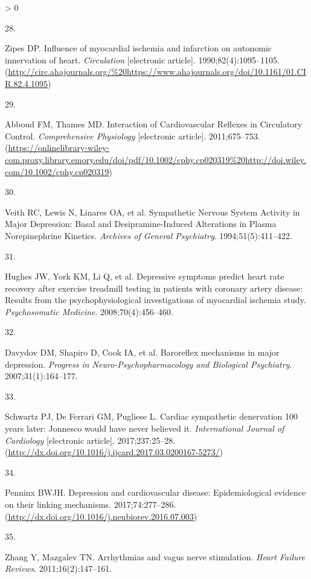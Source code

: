 \documentclass[
  11pt,
  openany]{book}
\newlength{\cslhangindent}
\newlength{\csllabelwidth}
\newenvironment{CSLReferences}[2] %
 {%
  \setlength{\parindent}{0pt}
  \ifodd #1 \everypar{\setlength{\hangindent}{\cslhangindent}}\ignorespaces\fi
  \ifnum #2 > 0
  \setlength{\parskip}{#2\baselineskip}
  \fi
 }%
 {}
\newcommand{\CSLLeftMargin}[1]{\parbox[t]{\csllabelwidth}{#1}}
\newcommand{\CSLRightInline}[1]{\parbox[t]{\linewidth - \csllabelwidth}{#1}\break}
\begin{document}
\begin{CSLReferences}{0}{0}
\leavevmode\hypertarget{ref-Zipes1990}{}%
\CSLLeftMargin{28. }
\CSLRightInline{Zipes DP. {Influence of myocardial ischemia and infarction on autonomic innervation of heart.} \emph{Circulation} {[}electronic article{]}. 1990;82(4):1095--1105. (\url{http://circ.ahajournals.org/\%20https://www.ahajournals.org/doi/10.1161/01.CIR.82.4.1095})}

\leavevmode\hypertarget{ref-Abboud2011}{}%
\CSLLeftMargin{29. }
\CSLRightInline{Abboud FM, Thames MD. {Interaction of Cardiovascular Reflexes in Circulatory Control}. \emph{Comprehensive Physiology} {[}electronic article{]}. 2011;675--753. (\url{https://onlinelibrary-wiley-com.proxy.library.emory.edu/doi/pdf/10.1002/cphy.cp020319\%20http://doi.wiley.com/10.1002/cphy.cp020319})}

\leavevmode\hypertarget{ref-Veith1994b}{}%
\CSLLeftMargin{30. }
\CSLRightInline{Veith RC, Lewis N, Linares OA, et al. {Sympathetic Nervous System Activity in Major Depression: Basal and Desipramine-Induced Alterations in Plasma Norepinephrine Kinetics}. \emph{Archives of General Psychiatry}. 1994;51(5):411--422. }

\leavevmode\hypertarget{ref-Hughes2008}{}%
\CSLLeftMargin{31. }
\CSLRightInline{Hughes JW, York KM, Li Q, et al. {Depressive symptoms predict heart rate recovery after exercise treadmill testing in patients with coronary artery disease: Results from the psychophysiological investigations of myocardial ischemia study}. \emph{Psychosomatic Medicine}. 2008;70(4):456--460. }

\leavevmode\hypertarget{ref-Davydov2007}{}%
\CSLLeftMargin{32. }
\CSLRightInline{Davydov DM, Shapiro D, Cook IA, et al. {Baroreflex mechanisms in major depression}. \emph{Progress in Neuro-Psychopharmacology and Biological Psychiatry}. 2007;31(1):164--177. }

\leavevmode\hypertarget{ref-Schwartz2017a}{}%
\CSLLeftMargin{33. }
\CSLRightInline{Schwartz PJ, De Ferrari GM, Pugliese L. {Cardiac sympathetic denervation 100 years later: Jonnesco would have never believed it}. \emph{International Journal of Cardiology} {[}electronic article{]}. 2017;237:25--28. (\url{http://dx.doi.org/10.1016/j.ijcard.2017.03.0200167-5273/})}

\leavevmode\hypertarget{ref-Penninx2017}{}%
\CSLLeftMargin{34. }
\CSLRightInline{Penninx BWJH. {Depression and cardiovascular disease: Epidemiological evidence on their linking mechanisms}. 2017;74:277--286. (\url{http://dx.doi.org/10.1016/j.neubiorev.2016.07.003})}

\leavevmode\hypertarget{ref-Zhang2011a}{}%
\CSLLeftMargin{35. }
\CSLRightInline{Zhang Y, Mazgalev TN. {Arrhythmias and vagus nerve stimulation}. \emph{Heart Failure Reviews}. 2011;16(2):147--161. }


\end{CSLReferences}
\end{document}
